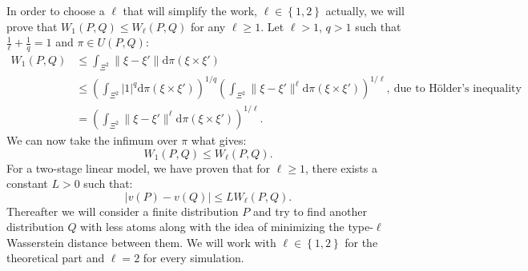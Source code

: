 \documentclass{amsart}
\begin{document}
In order to choose a $\ell$ that will simplify the work, $\ell\in\left\{1,2\right\}$ actually, we will prove that $W_1\left(P,Q\right)\leq W_\ell\left(P,Q\right)$ for any $\ell \geq 1$.  Let $\ell >1$, $q>1$ such that $\frac{1}{\ell}+\frac{1}{q}=1$ and $\pi\in U\left(P,Q\right)$:
\begin{align*}
W_1\left(P,Q\right)&\leq \int_{\Xi^2}\lVert \xi-\xi'\rVert \text{d}\pi\left(\xi\times\xi'\right) \\ &\leq \left(\int_{\Xi^2} \lvert 1\rvert^{q}\text{d}\pi\left(\xi\times\xi'\right)\right)^{1/q} \left(\int_{\Xi^2}\lVert \xi-\xi'\rVert^\ell\text{d}\pi\left(\xi\times\xi'\right)\right)^{1/\ell}, \: \text{due to Hölder's inequality} \\
&=\left(\int_{\Xi^2}\lVert \xi-\xi'\rVert^\ell\text{d}\pi\left(\xi\times\xi'\right)\right)^{1/\ell}.
\end{align*}
We can now take the infimum over $\pi$ what gives:
$$
W_1\left(P,Q\right)\leq W_\ell\left(P,Q\right).
$$
For a two-stage linear model, we have proven that for $\ell\geq1$, there exists a constant $L>0$ such that:
$$
\lvert v\left(P\right)-v\left(Q\right)\rvert \leq LW_\ell\left(P,Q\right).
$$
Thereafter we will consider a finite distribution $P$ and try to find another distribution $Q$ with less atoms along with the idea of minimizing the type-$\ell$ Wasserstein distance between them. We will work with $\ell\in\left\{1,2\right\}$ for the theoretical part and $\ell=2$ for every simulation.


\end{document}
